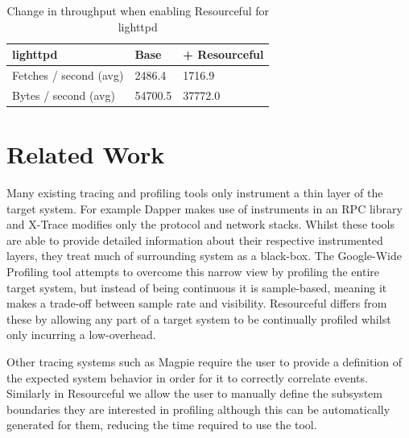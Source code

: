 \documentclass[letterpaper,twocolumn,10pt]{article}
\newcommand{\pname}{Resourceful}
\begin{document}
\begin{table}[ht!]
	\centering 
    \begin{tabular}{|l|l|l|}
    \hline
    \textbf{lighttpd}         & Base & + \pname \\ \hline
    Fetches / second (avg) & 2486.4 & 1716.9 \\ \hline
    Bytes / second (avg) & 54700.5 & 37772.0 \\ \hline
    \end{tabular}
    \caption{Change in throughput when enabling \pname{ } for lighttpd}
    \label{tbl:throughput} 
\end{table}

\section{Related Work} 




Many existing tracing and profiling tools only instrument a thin layer of the
target system. For example Dapper \cite{dapper} makes use of instruments in an
RPC library and X-Trace \cite{xtrace} modifies only the protocol and network
stacks. Whilst these tools are able to provide detailed information about their
respective instrumented layers, they treat much of surrounding system as a
black-box. The Google-Wide Profiling tool \cite{gwp} attempts to overcome this 
narrow view by profiling the entire target system, but instead of being continuous 
it is sample-based, meaning it makes a trade-off between sample rate and visibility. 
\pname{ } differs from these by allowing any part of a target system
to be continually profiled whilst only incurring a low-overhead.  

Other tracing systems such as Magpie \cite{magpieosdi} require the user to
provide a definition of the expected system behavior in order for it to
correctly correlate events. Similarly in \pname{} we allow the user to manually
define the subsystem boundaries they are interested in profiling although this
can be automatically generated for them, reducing the time required to use the
tool. 
\end{document}

